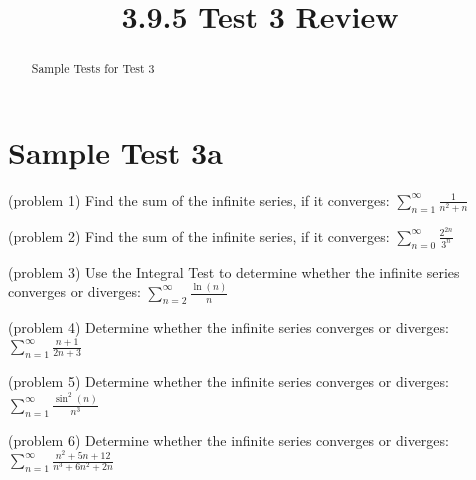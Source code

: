 \documentclass[handout]{ximera}
\title{3.9.5 Test 3 Review}
\begin{document}
\begin{abstract}
Sample Tests for Test 3
\end{abstract}

\maketitle

\section{Sample Test 3a}





\begin{problem}(problem 1)
Find the sum of the infinite series, if it converges: $\displaystyle\sum_{n=1}^\infty \frac{1}{n^2 +n}$

\end{problem}


\begin{problem}(problem 2)
Find the sum of the infinite series, if it converges: $\displaystyle \sum_{n=0}^\infty \frac{2^{2n}}{3^n}$

\end{problem}

\begin{problem}(problem 3)
Use the Integral Test to determine whether the infinite series converges or diverges:  $\displaystyle \sum_{n=2}^\infty \frac{\ln(n)}{n}$

\end{problem}

\begin{problem}(problem 4)
Determine whether the infinite series converges or diverges: $\displaystyle \sum_{n=1}^\infty \frac{n+1}{2n+3}$

\end{problem}

\begin{problem}(problem 5)
Determine whether the infinite series converges or diverges: $\displaystyle \sum_{n=1}^\infty \frac{\sin^2(n)}{n^3}$

\end{problem}

\begin{problem}(problem 6)
Determine whether the infinite series converges or diverges: $\displaystyle \sum_{n=1}^\infty \frac{n^2 + 5n + 12}{n^3 + 6n^2 + 2n}$

\end{problem}
\end{document}
